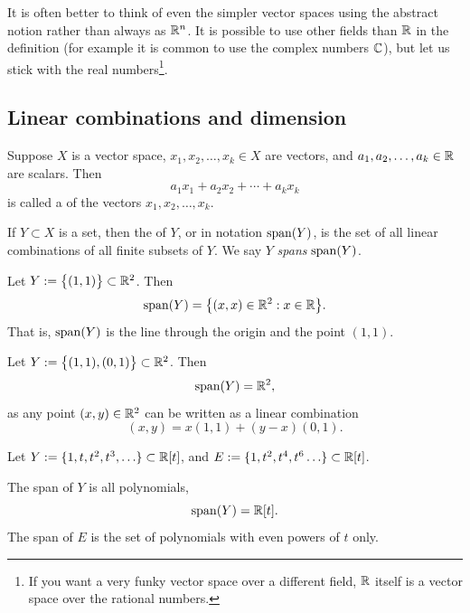 It is often better to think of even the simpler 
vector spaces using the abstract notion rather than always as ${\mathbb{R}}^n$.
It is possible to use other fields than ${\mathbb{R}}$ in the definition (for
example it is common to use the complex numbers ${\mathbb{C}}$), but let us stick with
the real numbers\footnote{If you want a very funky vector space over a different field,
${\mathbb{R}}$ itself is a vector space over the rational numbers.}.

\subsection{Linear combinations and dimension}

\begin{defn}
Suppose $X$ is a vector space,
$x_1, x_2, \ldots, x_k \in X$ are vectors, and
$a_1, a_2, \ldots, a_k \in {\mathbb{R}}$ are scalars.  Then
\begin{equation*}
a_1 x_1 + 
a_2 x_2 +  \cdots
+ a_k x_k
\end{equation*}
is called a \emph{} of the vectors $x_1, x_2,
\ldots, x_k$.

If $Y \subset X$ is a set, then the \emph{} of $Y$, or in notation
$\operatorname{span}(Y)$, is the set of all linear combinations
of all finite subsets of $Y$.  We 
say $Y$ \emph{spans} $\operatorname{span}(Y)$.
\end{defn}

\begin{example}
Let $Y := \bigl\{ (1,1) \bigr\} \subset {\mathbb{R}}^2$.  Then
\begin{equation*}
\operatorname{span}(Y)
=
\bigl\{ (x,x) \in {\mathbb{R}}^2 : x \in {\mathbb{R}} \bigr\} .
\end{equation*}
That is, $\operatorname{span}(Y)$ is the line through the origin and the point $(1,1)$.
\end{example}

\begin{example} \label{example:vecspr2span}
Let $Y := \bigl\{ (1,1), (0,1) \bigr\} \subset {\mathbb{R}}^2$.  Then
\begin{equation*}
\operatorname{span}(Y)
=
{\mathbb{R}}^2 ,
\end{equation*}
as any point $(x,y) \in {\mathbb{R}}^2$ can be written as
a linear combination
\begin{equation*}
(x,y) = x (1,1) + (y-x) (0,1) .
\end{equation*}
\end{example}

\begin{example}
Let $Y := \{ 1, t, t^2, t^3, \ldots \} \subset {\mathbb{R}}[t]$, and
$E := \{ 1, t^2, t^4, t^6 \ldots \} \subset {\mathbb{R}}[t]$.

The span of $Y$ is all polynomials,
\begin{equation*}
\operatorname{span}(Y) = {\mathbb{R}}[t] .
\end{equation*}
The span of $E$ is the set of polynomials with even powers of $t$ only.
\end{example}

